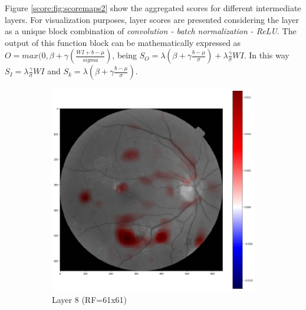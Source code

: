 Figure \ref{score:fig:scoremaps2} show the aggregated scores for different intermediate layers. For visualization purposes, layer scores are presented considering the layer as a unique block combination of \emph{convolution - batch normalization - ReLU}. The output of this function block can be mathematically expressed as $O = max(0, \beta + \gamma(\frac{WI + b - \mu}{sigma})$, being $S_O = \lambda (\beta + \gamma \frac{b - \mu}{\sigma}) + \lambda \frac{\gamma}{\sigma}WI$. In this way $S_I = \lambda \frac{\gamma}{\sigma}WI$ and $S_k = \lambda (\beta + \gamma \frac{b - \mu}{\sigma})$. 

\begin{figure}[!ht]
	\centering
	\begin{subfigure}{0.4\textwidth}
		\includegraphics[width=\textwidth]{Figures/chapter_interpretation/figures/maps/rf61c.png}
		\caption{Layer 8 (RF=61x61)}
		\label{score:fig:score_rf61}
	\end{subfigure}
	~ %
	\begin{subfigure}{0.4\textwidth}

\end{subfigure}
\end{figure}
